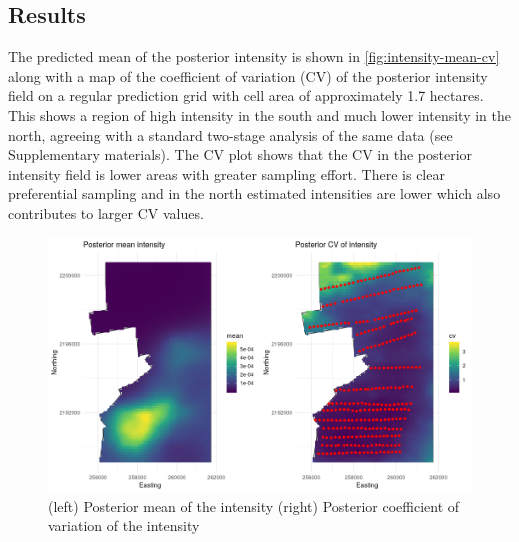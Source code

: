 \documentclass[preprint,12pt]{elsarticle}
\begin{document}
\subsection*{Results}

The predicted mean of the posterior intensity is shown in \autoref{fig:intensity-mean-cv} along with a map of the coefficient of variation (CV) of the posterior intensity field on a regular prediction grid with cell area of approximately 1.7 hectares.  This shows a region of high intensity in the south and much lower intensity in the north, agreeing with a standard two-stage analysis of the same data (see Supplementary materials).  The CV plot shows that the CV in the posterior intensity field is lower areas with greater sampling effort.  There is clear preferential sampling and in the north estimated intensities are lower which also contributes to larger CV values.
\begin{figure}
	\includegraphics[scale=0.5]{figures/intensity_mean_cv.png}
	\caption{(left) Posterior mean of the intensity (right) Posterior coefficient of variation of the intensity}
	\label{fig:intensity-mean-cv}
\end{figure}
\end{document}
